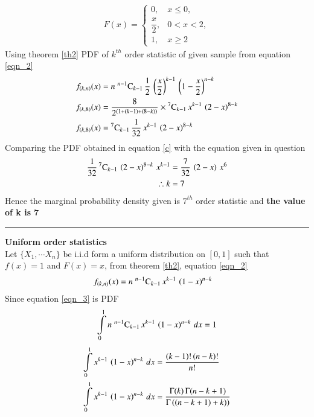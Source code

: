 \documentclass[journal,12pt,twocolumn]{IEEEtran}
\begin{document}
 \begin{align}
 F(x) = 
 \begin{cases}
      0,             &x \leq 0, \\ 
  \dfrac{x}{2},      &0 < x< 2, \\ 
     1,              & x\geq2
 \end{cases} \label{e}
 \end{align}
Using theorem \eqref{th2} PDF of $k^{th}$ order statistic of given sample from equation \eqref{eqn_2}
\begin{align}
f_{(k,n)}(x) &= n\;{}^{n-1}\mathrm{C}_{k-1}\,\dfrac{1}{2}\,\left(\dfrac{x}{2}\right)^{k-1}\,\left(1-\dfrac{x}{2}\right)^{n-k} \\
f_{(k,8)}(x) &= \dfrac{8}{2^{(1+(k-1)+(8-k))}}\times{}^{7}\mathrm{C}_{k-1}\,x^{k-1}\,\left(2-x\right)^{8-k}\\
f_{(k,8)}(x) &= {}^{7}\mathrm{C}_{k-1}\,\dfrac{1}{32}\,x^{k-1}\,\left(2-x\right)^{8-k} \label{c}
 \end{align}
Comparing the PDF obtained in equation \eqref{c} with the equation given in question
\begin{align}
\dfrac{1}{32}\,{}^{7}\mathrm{C}_{k-1}\,\left(2-x\right)^{8-k}\,x^{k-1} &= \dfrac{7}{32}\,\left(2-x\right)\,x^6 \\
\therefore k &= 7 
\end{align}
Hence the marginal probability density given is $7^{th}$ order statistic and 
\textbf{the value of k is 7} 
\vspace{0.5cm}
\hrule
\vspace{0.5cm}
\begin{definition}
\label{def2}
\textbf{Uniform order statistics} \\
Let $\{X_1,\cdots X_n\}$ be i.i.d form a uniform distribution on $[0,1]$ such that $f(x) = 1$ and $F(x)=x$,
from theorem \eqref{th2}, equation \eqref{eqn_2}
\begin{align}
f_{(k,n)}(x) &= n\;{}^{n-1}\mathrm{C}_{k-1}\,x^{k-1}\,\left(1-x\right)^{n-k}\label{eqn_3}
\end{align}
Since equation \eqref{eqn_3} is PDF 
\begin{equation}
 \int\limits_{0}^{1} n\;{}^{n-1}\mathrm{C}_{k-1}\,x^{k-1}\,\left(1-x\right)^{n-k} \,dx  = 1    
\end{equation}
\begin{align}
\int\limits_{0}^{1} x^{k-1}\,\left(1-x\right)^{n-k} \,dx  &= \dfrac{(k-1)!\,(n-k)!}{n!}  \\
\int\limits_{0}^{1} x^{k-1}\,\left(1-x\right)^{n-k} \,dx  &= \dfrac{\Gamma(k)\,\Gamma(n-k+1)}{\Gamma\left((n-k+1)+k)\right)} 
\label{beqn}
\end{align}
\label{def3}
\end{definition}
\end{document}
